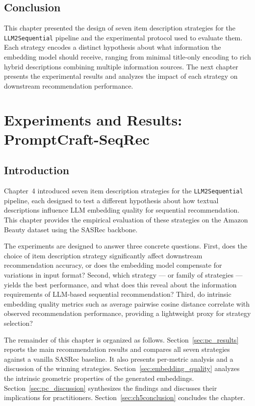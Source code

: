 \documentclass[12pt,a4paper]{report}
\begin{document}
\section{Conclusion}
\label{sec:ch4conclusion}

This chapter presented the design of seven item description strategies for the
\texttt{LLM2Sequential} pipeline and the experimental protocol used to evaluate
them. Each strategy encodes a distinct hypothesis about what information the
embedding model should receive, ranging from minimal title-only encoding to
rich hybrid descriptions combining multiple information sources. The next
chapter presents the experimental results and analyzes the impact of each
strategy on downstream recommendation performance.


\chapter{Experiments and Results: PromptCraft-SeqRec}

\section{Introduction}

Chapter~4 introduced seven item description strategies for the
\texttt{LLM2Sequential} pipeline, each designed to test a different hypothesis
about how textual descriptions influence LLM embedding quality for sequential
recommendation. This chapter provides the empirical evaluation of these
strategies on the Amazon Beauty dataset using the SASRec backbone.

The experiments are designed to answer three concrete questions. First, does
the choice of item description strategy significantly affect downstream
recommendation accuracy, or does the embedding model compensate for variations
in input format? Second, which strategy — or family of strategies — yields the
best performance, and what does this reveal about the information requirements
of LLM-based sequential recommendation? Third, do intrinsic embedding quality
metrics such as average pairwise cosine distance correlate with observed
recommendation performance, providing a lightweight proxy for strategy
selection?

The remainder of this chapter is organized as follows.
Section~\ref{sec:pc_results} reports the main recommendation results and
compares all seven strategies against a vanilla SASRec baseline. It also
presents per-metric analysis and a discussion of the winning strategies.
Section~\ref{sec:embedding_quality} analyzes the intrinsic geometric properties
of the generated embeddings. Section~\ref{sec:pc_discussion} synthesizes the
findings and discusses their implications for practitioners.
Section~\ref{sec:ch5conclusion} concludes the chapter.
\end{document}
